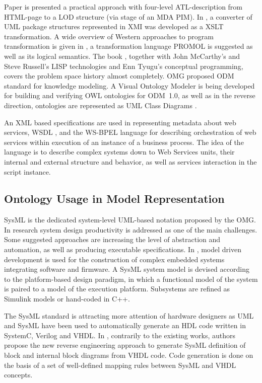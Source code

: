 \documentclass[conference]{IEEEtran}
\begin{document}
Paper \cite{Malki} is presented a practical approach with four-level ATL-description from HTML-page to a LOD structure (via stage of an MDA PIM). In \cite{uml2owl}, a converter of UML package structures represented in XMI was developed as a XSLT transformation. A wide overview of Western approaches to program transformation is given in \cite{Dama,Dama2}, a transformation language PROMOL is suggested as well as its logical semantics. The book \cite{Dama}, together with John McCarthy's and Steve Russell's LISP technologies and Enn Tyugu's conceptual programming, covers the problem space history almost completely. OMG proposed ODM standard \cite{odmprof} for knowledge modeling.  A Visual Ontology Modeler \cite{odnext} is being developed for building and verifying OWL ontologies for ODM~1.0, as well as in the reverse direction, ontologies are represented as UML Class Diagrams \cite{odmvis}.

An XML based specifications are used in representing metadata about web services, WSDL \cite{wsdl}, and the WS-BPEL language \cite{wsbpel} for describing orchestration of web services within execution of an instance of a business process.  The idea of the language is to describe complex systems down to Web Services units, their internal and external structure and behavior, as well as services interaction in the script instance.

\subsection{Ontology Usage in Model Representation}
\label{sec:use-onto}

SysML is the dedicated system-level UML-based notation proposed by the OMG. In research \cite{raslan} system design productivity is addressed as one of the main challenges. Some suggested approaches are increasing the level of abstraction and automation, as well as producing executable specifications. In \cite{natale}, model driven development is used for the construction of complex embedded systems integrating software and firmware. A SysML system model is devised according to the platform-based design paradigm, in which a functional model of the system is paired to a model of the execution platform. Subsystems are refined as Simulink models or hand-coded in C++.

The SysML standard is attracting more attention of hardware designers as UML and SysML have been used to automatically generate an HDL code written in SystemC, Verilog and VHDL. In \cite{boute}, contrarily to the existing works, authors propose the new reverse engineering approach to generate SysML definition of block and internal block diagrams from VHDL code. Code generation is done on the basis of a set of well-defined mapping rules between SysML and VHDL concepts.
\end{document}
